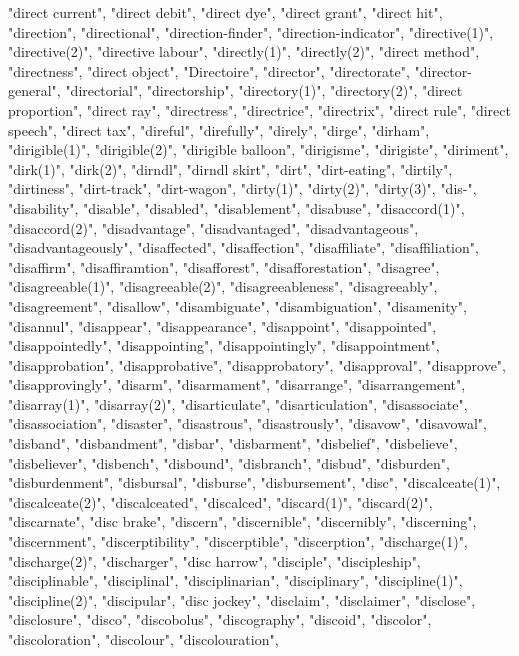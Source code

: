 "direct current",
"direct debit",
"direct dye",
"direct grant",
"direct hit",
"direction",
"directional",
"direction-finder",
"direction-indicator",
"directive(1)",
"directive(2)",
"directive labour",
"directly(1)",
"directly(2)",
"direct method",
"directness",
"direct object",
"Directoire",
"director",
"directorate",
"director-general",
"directorial",
"directorship",
"directory(1)",
"directory(2)",
"direct proportion",
"direct ray",
"directress",
"directrice",
"directrix",
"direct rule",
"direct speech",
"direct tax",
"direful",
"direfully",
"direly",
"dirge",
"dirham",
"dirigible(1)",
"dirigible(2)",
"dirigible balloon",
"dirigisme",
"dirigiste",
"diriment",
"dirk(1)",
"dirk(2)",
"dirndl",
"dirndl skirt",
"dirt",
"dirt-eating",
"dirtily",
"dirtiness",
"dirt-track",
"dirt-wagon",
"dirty(1)",
"dirty(2)",
"dirty(3)",
"dis-",
"disability",
"disable",
"disabled",
"disablement",
"disabuse",
"disaccord(1)",
"disaccord(2)",
"disadvantage",
"disadvantaged",
"disadvantageous",
"disadvantageously",
"disaffected",
"disaffection",
"disaffiliate",
"disaffiliation",
"disaffirm",
"disaffiramtion",
"disafforest",
"disafforestation",
"disagree",
"disagreeable(1)",
"disagreeable(2)",
"disagreeableness",
"disagreeably",
"disagreement",
"disallow",
"disambiguate",
"disambiguation",
"disamenity",
"disannul",
"disappear",
"disappearance",
"disappoint",
"disappointed",
"disappointedly",
"disappointing",
"disappointingly",
"disappointment",
"disapprobation",
"disapprobative",
"disapprobatory",
"disapproval",
"disapprove",
"disapprovingly",
"disarm",
"disarmament",
"disarrange",
"disarrangement",
"disarray(1)",
"disarray(2)",
"disarticulate",
"disarticulation",
"disassociate",
"disassociation",
"disaster",
"disastrous",
"disastrously",
"disavow",
"disavowal",
"disband",
"disbandment",
"disbar",
"disbarment",
"disbelief",
"disbelieve",
"disbeliever",
"disbench",
"disbound",
"disbranch",
"disbud",
"disburden",
"disburdenment",
"disbursal",
"disburse",
"disbursement",
"disc",
"discalceate(1)",
"discalceate(2)",
"discalceated",
"discalced",
"discard(1)",
"discard(2)",
"discarnate",
"disc brake",
"discern",
"discernible",
"discernibly",
"discerning",
"discernment",
"discerptibility",
"discerptible",
"discerption",
"discharge(1)",
"discharge(2)",
"discharger",
"disc harrow",
"disciple",
"discipleship",
"disciplinable",
"disciplinal",
"disciplinarian",
"disciplinary",
"discipline(1)",
"discipline(2)",
"discipular",
"disc jockey",
"disclaim",
"disclaimer",
"disclose",
"disclosure",
"disco",
"discobolus",
"discography",
"discoid",
"discolor",
"discoloration",
"discolour",
"discolouration",
